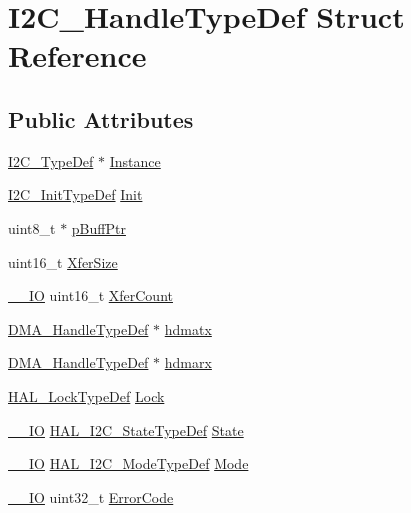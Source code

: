 \hypertarget{struct_i2_c___handle_type_def}{\section{I2\-C\-\_\-\-Handle\-Type\-Def Struct Reference}
\label{struct_i2_c___handle_type_def}
}
\subsection*{Public Attributes}
\begin{DoxyCompactItemize}
\item 
\hyperlink{struct_i2_c___type_def}{I2\-C\-\_\-\-Type\-Def} $\ast$ \hyperlink{struct_i2_c___handle_type_def_ad83b15a12a41fb3958c55085adf931dd}{Instance}
\item 
\hyperlink{struct_i2_c___init_type_def}{I2\-C\-\_\-\-Init\-Type\-Def} \hyperlink{struct_i2_c___handle_type_def_a86c7e0e7be29686399208f9bb07ae2a2}{Init}
\item 
uint8\-\_\-t $\ast$ \hyperlink{struct_i2_c___handle_type_def_a6adc95451a3eec4b104564fc3fe8b109}{p\-Buff\-Ptr}
\item 
uint16\-\_\-t \hyperlink{struct_i2_c___handle_type_def_a47afa75961930ab1743f47245fdf6e85}{Xfer\-Size}
\item 
\hyperlink{core__sc300_8h_aec43007d9998a0a0e01faede4133d6be}{\-\_\-\-\_\-\-I\-O} uint16\-\_\-t \hyperlink{struct_i2_c___handle_type_def_a1860b3cf8f463c2751d0c935f33e0ad4}{Xfer\-Count}
\item 
\hyperlink{group___d_m_a___exported___types_ga92b907d56a9c29b93d46782a7a04f91e}{D\-M\-A\-\_\-\-Handle\-Type\-Def} $\ast$ \hyperlink{struct_i2_c___handle_type_def_adb4429cdf02e5564464a1517229826b6}{hdmatx}
\item 
\hyperlink{group___d_m_a___exported___types_ga92b907d56a9c29b93d46782a7a04f91e}{D\-M\-A\-\_\-\-Handle\-Type\-Def} $\ast$ \hyperlink{struct_i2_c___handle_type_def_ad1778574d987009683c8120bd16aa9cf}{hdmarx}
\item 
\hyperlink{stm32l1xx__hal__def_8h_ab367482e943333a1299294eadaad284b}{H\-A\-L\-\_\-\-Lock\-Type\-Def} \hyperlink{struct_i2_c___handle_type_def_af28a07c34f97e2b2ade505357a467a50}{Lock}
\item 
\hyperlink{core__sc300_8h_aec43007d9998a0a0e01faede4133d6be}{\-\_\-\-\_\-\-I\-O} \hyperlink{group___h_a_l__state__structure__definition_gaef355af8eab251ae2a19ee164ad81c37}{H\-A\-L\-\_\-\-I2\-C\-\_\-\-State\-Type\-Def} \hyperlink{struct_i2_c___handle_type_def_a5b37a3a29bc768fb1c3ff192ab94b6e3}{State}
\item 
\hyperlink{core__sc300_8h_aec43007d9998a0a0e01faede4133d6be}{\-\_\-\-\_\-\-I\-O} \hyperlink{group___h_a_l__mode__structure__definition_gabcbb7b844f2ffd63c4e530c117882062}{H\-A\-L\-\_\-\-I2\-C\-\_\-\-Mode\-Type\-Def} \hyperlink{struct_i2_c___handle_type_def_a97b1beafd59ed47be4b742562d100278}{Mode}
\item 
\hyperlink{core__sc300_8h_aec43007d9998a0a0e01faede4133d6be}{\-\_\-\-\_\-\-I\-O} uint32\-\_\-t \hyperlink{struct_i2_c___handle_type_def_a15acfdb4bc2e1da9470e9823f127d8f9}{Error\-Code}
\end{DoxyCompactItemize}



